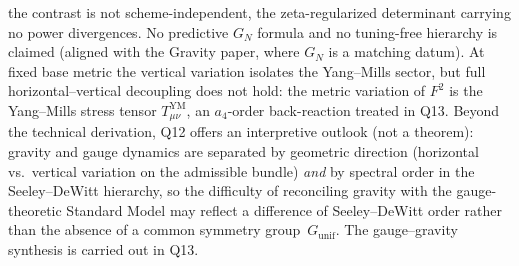 \documentclass[11pt,a4paper]{article}
\begin{document}
    the contrast is not scheme-independent, the zeta-regularized determinant carrying no power
    divergences. No predictive $G_N$ formula and no tuning-free hierarchy is claimed (aligned with
    the Gravity paper, where $G_N$ is a matching datum).
    At fixed base metric the vertical variation isolates the Yang--Mills sector, but full
    horizontal--vertical decoupling does not hold: the metric variation of $F^2$ is the
    Yang--Mills stress tensor $T^{\mathrm{YM}}_{\mu\nu}$, an $a_4$-order back-reaction treated in Q13.
    Beyond the technical derivation, Q12 offers an interpretive outlook (not a theorem):
    gravity and gauge dynamics are separated by geometric direction (horizontal
    vs.\ vertical variation on the admissible bundle) \emph{and} by spectral order in the
    Seeley--DeWitt hierarchy, so the difficulty of reconciling gravity with the gauge-theoretic
    Standard Model may reflect a difference of Seeley--DeWitt order rather than the absence of a
    common symmetry group~$G_{\mathrm{unif}}$.
    The gauge--gravity synthesis is carried out in Q13.
\end{document}
